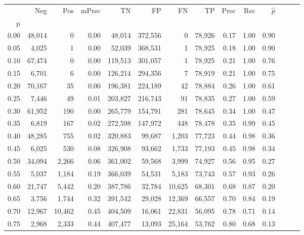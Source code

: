 \begin{tabular}{rrrrrrrrrrrrrr}
\toprule
{} &     Neg &     Pos & mPrec &       TN &       FP &      FN &      TP &  Prec &   Rec & $\hat{p}$ \\
p    &         &         &       &          &          &         &         &       &       &           \\
\midrule
0.00 &  48,014 &       0 &  0.00 &   48,014 &  372,556 &       0 &  78,926 &  0.17 &  1.00 &      0.90 \\
0.05 &   4,025 &       1 &  0.00 &   52,039 &  368,531 &       1 &  78,925 &  0.18 &  1.00 &      0.90 \\
0.10 &  67,474 &       0 &  0.00 &  119,513 &  301,057 &       1 &  78,925 &  0.21 &  1.00 &      0.76 \\
0.15 &   6,701 &       6 &  0.00 &  126,214 &  294,356 &       7 &  78,919 &  0.21 &  1.00 &      0.75 \\
0.20 &  70,167 &      35 &  0.00 &  196,381 &  224,189 &      42 &  78,884 &  0.26 &  1.00 &      0.61 \\
0.25 &   7,446 &      49 &  0.01 &  203,827 &  216,743 &      91 &  78,835 &  0.27 &  1.00 &      0.59 \\
0.30 &  61,952 &     190 &  0.00 &  265,779 &  154,791 &     281 &  78,645 &  0.34 &  1.00 &      0.47 \\
0.35 &   6,819 &     167 &  0.02 &  272,598 &  147,972 &     448 &  78,478 &  0.35 &  0.99 &      0.45 \\
0.40 &  48,285 &     755 &  0.02 &  320,883 &   99,687 &   1,203 &  77,723 &  0.44 &  0.98 &      0.36 \\
0.45 &   6,025 &     530 &  0.08 &  326,908 &   93,662 &   1,733 &  77,193 &  0.45 &  0.98 &      0.34 \\
0.50 &  34,094 &   2,266 &  0.06 &  361,002 &   59,568 &   3,999 &  74,927 &  0.56 &  0.95 &      0.27 \\
0.55 &   5,037 &   1,184 &  0.19 &  366,039 &   54,531 &   5,183 &  73,743 &  0.57 &  0.93 &      0.26 \\
0.60 &  21,747 &   5,442 &  0.20 &  387,786 &   32,784 &  10,625 &  68,301 &  0.68 &  0.87 &      0.20 \\
0.65 &   3,756 &   1,744 &  0.32 &  391,542 &   29,028 &  12,369 &  66,557 &  0.70 &  0.84 &      0.19 \\
0.70 &  12,967 &  10,462 &  0.45 &  404,509 &   16,061 &  22,831 &  56,095 &  0.78 &  0.71 &      0.14 \\
0.75 &   2,968 &   2,333 &  0.44 &  407,477 &   13,093 &  25,164 &  53,762 &  0.80 &  0.68 &      0.13 \\

\end{tabular}
